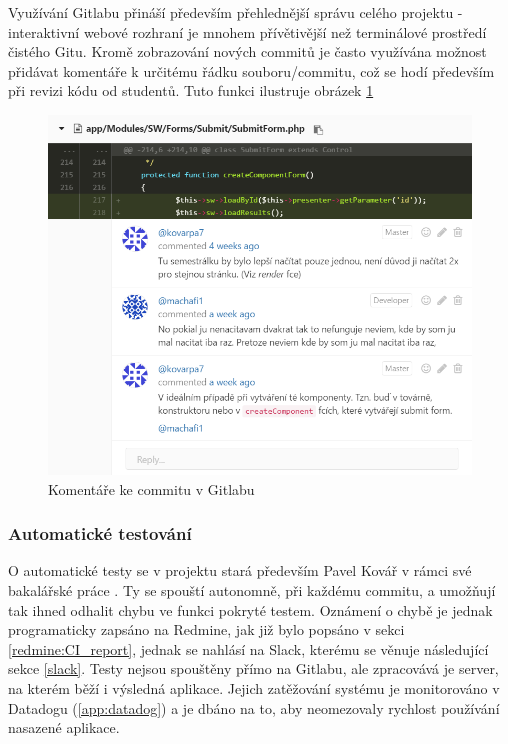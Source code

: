 Využívání Gitlabu přináší především přehlednější správu celého projektu - interaktivní webové rozhraní je mnohem přívětivější než terminálové prostředí čistého Gitu. Kromě zobrazování nových commitů je často využívána možnost přidávat komentáře k určitému řádku souboru/commitu, což se hodí především při revizi kódu od studentů. Tuto funkci ilustruje obrázek \ref{picture:gitlab-commit}
\begin{figure}[h]
\includegraphics[width=\textwidth]{../png/gitlab-commit.png}
\caption{Komentáře ke commitu v Gitlabu} \label{picture:gitlab-commit}
\end{figure}
\subsubsection{Automatické testování} \label{version:gitlab:tests}
O automatické testy se v projektu stará především Pavel Kovář v rámci své bakalářské práce \cite{kovar}. Ty se spouští autonomně, při každému commitu, a umožňují tak ihned odhalit chybu ve funkci pokryté testem. Oznámení o chybě je jednak programaticky zapsáno na Redmine, jak již bylo popsáno v sekci \ref{redmine:CI_report}, jednak se nahlásí na Slack, kterému se věnuje následující sekce \ref{slack}. Testy nejsou spouštěny přímo na Gitlabu, ale zpracovává je server, na kterém běží i výsledná aplikace. Jejich zatěžování systému je monitorováno v Datadogu (\ref{app:datadog}) a je dbáno na to, aby neomezovaly rychlost používání nasazené aplikace.


